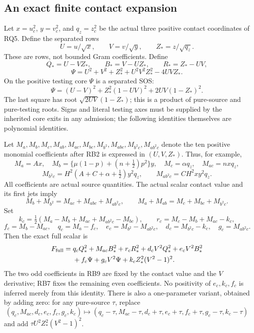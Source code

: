 \subsection{An exact finite contact expansion}

Let $x=u_c^2$, $y=v_c^2$, and $q_z=z_c^2$ be the actual three
positive contact coordinates of RQ5. Define the separated rows
\[
 U=u/\sqrt{x},\qquad V=v/\sqrt{y},\qquad Z_*=z/\sqrt{q_z}.
 \tag{RB3}
\]
These are rows, not bounded Gram coefficients. Define
\[
 Q_*=U-VZ_*,\qquad B_*=V-UZ_*,\qquad R_*=Z_*-UV,
\]
\[
 \Psi=U^2+V^2+Z_*^2+U^2V^2Z_*^2-4UVZ_* .
 \tag{RB4}
\]
On the positive testing core $\Psi$ is a separated SOS:
\[
 \Psi=(U-V)^2+Z_*^2(1-UV)^2
                     +2UV(1-Z_*)^2.
 \tag{RB5}
\]
The last square has root $\sqrt{2UV}(1-Z_*)$; this is a product
of pure-source and pure-testing roots. Signs and literal testing
axes must be supplied by the inherited core exits in any admission;
the following identities themselves are polynomial identities.

Let $M_a,M_b,M_c,M_{ab},M_{ac},M_{bc},M_{b^2},
M_{abc},M_{b^2c},M_{ab^2c}$ denote the ten positive monomial
coefficients after RB2 is expressed in $(U,V,Z_*)$. Thus, for example,
\[
 M_a=Ax,\quad M_b=\{\mu(1-p)+(n+\tfrac12)p^2\}y,\quad
 M_c=\alpha q_z,\quad M_{ac}=nxq_z,
\]
\[
 M_{b^2c}=H^2(A+C+\alpha+\tfrac12)y^2q_z,\qquad
 M_{ab^2c}=CH^2xy^2q_z.
\tag{RB6}
\]
All coefficients are actual source quantities.
The actual scalar contact value and its first jets imply
\[
 M_b+M_{b^2}=M_{ac}+M_{abc}+M_{ab^2c},\qquad
 M_a+M_{ab}=M_c+M_{bc}+M_{b^2c}.
\tag{RB7}
\]
Set
\[
 k_c=\tfrac12(M_a-M_b+M_{ac}+M_{ab^2c}-M_{bc}),\qquad
 r_c=M_c-M_b+M_{ac}-k_c,
\]
\[
 f_c=M_b-M_{ac},\quad q_c=M_a-f_c,\quad
 e_c=M_{b^2}-M_{ab^2c},\quad d_c=M_{b^2c}-k_c,\quad
 g_c=M_{ab^2c}.
\tag{RB8}
\]
Then the exact full scalar is
\begin{align*}
F_{\rm full}={}&q_cQ_*^2+M_{ac}B_*^2+r_cR_*^2
 +d_cV^2Q_*^2+e_cV^2B_*^2\\
&+f_c\Psi+g_cV^2\Psi
 +k_cZ_*^2(V^2-1)^2 .
\end{align*}
The two odd coefficients in RB9 are fixed by the contact value and
the $V$ derivative; RB7 fixes the remaining even coefficients.
No positivity of $e_c,k_c,f_c$ is inferred merely from this identity.
There is also a one-parameter variant, obtained by adding zero:
for any pure-source $\tau$, replace
\[
 (q_c,M_{ac},d_c,e_c,f_c,g_c,k_c)
 \longmapsto
 (q_c-\tau,M_{ac}-\tau,d_c+\tau,e_c+\tau,
  f_c+\tau,g_c-\tau,k_c-\tau)
\]
and add $\tau U^2Z_*^2(V^2-1)^2$.

